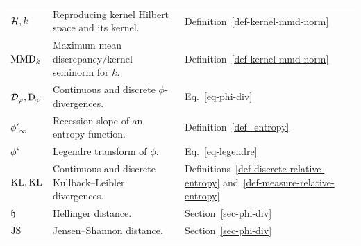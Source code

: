 {\begin{longtable}{>{\raggedright\arraybackslash}p{}
                  >{\raggedright\arraybackslash}p{}
                  >{\raggedright\arraybackslash}p{}}
$\mathcal{H},k$ & Reproducing kernel Hilbert space and its kernel. & Definition~\ref{def-kernel-mmd-norm} \\
$\operatorname{MMD}_k$ & Maximum mean discrepancy/kernel seminorm for $k$. & Definition~\ref{def-kernel-mmd-norm} \\
$\mathcal{D}_\varphi,\mathrm{D}_\varphi$ & Continuous and discrete $\phi$-divergences. & Eq.~\eqref{eq-phi-div} \\
$\phi'_\infty$ & Recession slope of an entropy function. & Definition~\ref{def_entropy} \\
$\phi^\star$ & Legendre transform of $\phi$. & Eq.~\eqref{eq-legendre} \\
$\operatorname{KL},\mathrm{KL}$ & Continuous and discrete Kullback--Leibler divergences. & Definitions~\ref{def-discrete-relative-entropy} and~\ref{def-measure-relative-entropy} \\
$\mathfrak{h}$ & Hellinger distance. & Section~\ref{sec-phi-div} \\
$\operatorname{JS}$ & Jensen--Shannon distance. & Section~\ref{sec-phi-div} \\


\end{longtable}}
